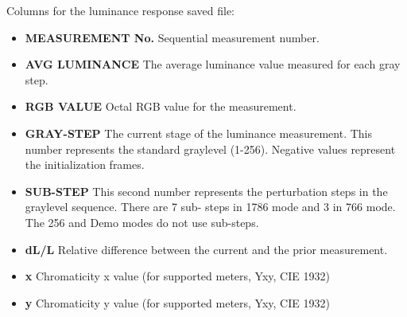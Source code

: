 Columns for the luminance response saved file:


\begin{itemize}
	\item[] \textbf{MEASUREMENT No.} \enskip Sequential measurement number.
	\item[] \textbf{AVG LUMINANCE} \enskip The average luminance value measured for each gray step.
	\item[] \textbf{RGB VALUE} \enskip Octal RGB value for the measurement.
	\item[] \textbf{GRAY-STEP} \enskip The current stage of the luminance measurement. This number represents the standard graylevel (1-256). Negative values represent the initialization frames.
	\item[] \textbf{SUB-STEP} \enskip This second number represents the perturbation steps in the graylevel sequence. There are 7 sub- steps in 1786 mode and 3 in 766 mode. The 256 and Demo modes do not use sub-steps.
	\item[] \textbf{dL/L} \enskip Relative difference between the current and the prior measurement.
	\item[] \textbf{x} \enskip Chromaticity x value (for supported meters, Yxy, CIE 1932)
	\item[] \textbf{y} \enskip Chromaticity y value (for supported meters, Yxy, CIE 1932)
\end{itemize}

